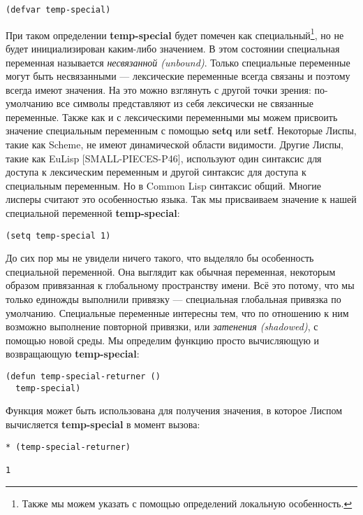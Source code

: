 \begin{verbatim}
(defvar temp-special)
\end{verbatim}

При таком определении \textbf{temp-special} будет помечен как специальный\footnote{Также мы можем указать с помощью определений локальную особенность.}, но не будет инициализирован каким-либо значением. В этом состоянии специальная переменная называется \emph{несвязанной (unbound)}. Только специальные переменные могут быть несвязанными --- лексические переменные всегда связаны и поэтому всегда имеют значения. На это можно взглянуть с другой точки зрения: по-умолчанию все символы представляют из себя лексически не связанные переменные. Также как и с лексическими переменными мы можем присвоить значение специальным переменным с помощью \textbf{setq} или \textbf{setf}. Некоторые Лиспы, такие как Scheme, не имеют динамической области видимости. Другие Лиспы, такие как EuLisp [SMALL-PIECES-P46], используют один синтаксис для доступа к лексическим переменным и другой синтаксис для доступа к специальным переменным. Но в Common Lisp синтаксис общий. Многие лисперы считают это особенностью языка. Так мы присваиваем значение к нашей специальной переменной \textbf{temp-special}:

\begin{verbatim}
(setq temp-special 1)
\end{verbatim}

До сих пор мы не увидели ничего такого, что выделяло бы особенность специальной переменной. Она выглядит как обычная переменная, некоторым образом привязанная к глобальному пространству имени. Всё это потому, что мы только единожды выполнили привязку --- специальная глобальная привязка по умолчанию. Специальные переменные интересны тем, что по отношению к ним возможно выполнение повторной привязки, или \emph{затенения (shadowed)}, с помощью новой среды. Мы определим функцию просто вычисляющую и возвращающую \textbf{temp-special}:

\begin{verbatim}
(defun temp-special-returner ()
  temp-special)
\end{verbatim}

Функция может быть использована для получения значения, в которое Лиспом вычисляется \textbf{temp-special} в момент вызова:

\begin{verbatim}
* (temp-special-returner)

1
\end{verbatim}

